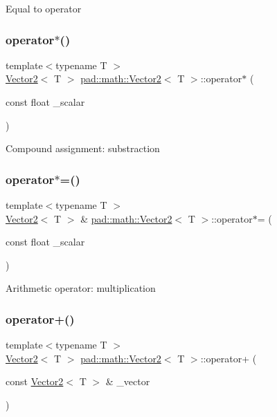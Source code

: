 Equal to operator \mbox{\label{structpad_1_1math_1_1_vector2_af6fa8a12be3dbf3cf27500df9eb93496}} 
\subsubsection{\texorpdfstring{operator$\ast$()}{operator*()}}
{\footnotesize\ttfamily template$<$typename T $>$ \\
\mbox{\hyperlink{structpad_1_1math_1_1_vector2}{Vector2}}$<$ T $>$ \mbox{\hyperlink{structpad_1_1math_1_1_vector2}{pad\+::math\+::\+Vector2}}$<$ T $>$\+::operator$\ast$ (\begin{DoxyParamCaption}\item[{const float}]{\+\_\+scalar }\end{DoxyParamCaption})}

Compound assignment\+: substraction \mbox{\label{structpad_1_1math_1_1_vector2_a2560ceda08780dc1543b3367eda784e4}} 
\subsubsection{\texorpdfstring{operator$\ast$=()}{operator*=()}}
{\footnotesize\ttfamily template$<$typename T $>$ \\
\mbox{\hyperlink{structpad_1_1math_1_1_vector2}{Vector2}}$<$ T $>$ \& \mbox{\hyperlink{structpad_1_1math_1_1_vector2}{pad\+::math\+::\+Vector2}}$<$ T $>$\+::operator$\ast$= (\begin{DoxyParamCaption}\item[{const float}]{\+\_\+scalar }\end{DoxyParamCaption})}

Arithmetic operator\+: multiplication \mbox{\label{structpad_1_1math_1_1_vector2_af15cdb7c3cc3862a45ea35b5d6f934be}} 
\subsubsection{\texorpdfstring{operator+()}{operator+()}}
{\footnotesize\ttfamily template$<$typename T $>$ \\
\mbox{\hyperlink{structpad_1_1math_1_1_vector2}{Vector2}}$<$ T $>$ \mbox{\hyperlink{structpad_1_1math_1_1_vector2}{pad\+::math\+::\+Vector2}}$<$ T $>$\+::operator+ (\begin{DoxyParamCaption}\item[{const \mbox{\hyperlink{structpad_1_1math_1_1_vector2}{Vector2}}$<$ T $>$ \&}]{\+\_\+vector }\end{DoxyParamCaption})}


